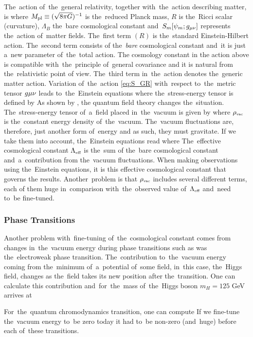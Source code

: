 The~action of~the~general relativity, together with~the~action describing matter, is
where $M_{\text{\scriptsize pl}}\equiv(\sqrt{8\pi G})^{-1}$ is the~reduced Planck mass, $R$ is the~Ricci scalar (curvature), $\Lambda_B$ the~bare cosmological constant and~$S_m[\psi_m;g_{\mu\nu}]$ represents the~action of~matter fields. The~first term $(R)$ is the~standard Einstein-Hilbert action. The~second term consists of the~\textit{bare} cosmological constant and~it is just a~new parameter of~the~total action. The cosmology constant in the action above is compatible with~the~principle of~general covariance and it is natural from the~relativistic point of view. The~third term in~the~action denotes the~generic matter action. Variation of~the~action \eqref{eq:S_GR} with~respect to~the~metric tensor $g{\mu\nu}$ leads to~the~Einstein equations
where the~stress-energy tensor is defined by
As shown by \textcite{1968SPhD...12.1040S}, the quantum field theory changes the~situation. The~stress-energy tensor of~a~field placed in~the~vacuum is given by
where $\rho_\text{\tiny vac}$ is the~constant energy density of~the~vacuum. The~vacuum fluctuations are, therefore, just another form of~energy and as such, they must gravitate. If we take them into account,  the~Einstein equations read
where
The~effective cosmological constant $\Lambda_\text{\tiny eff}$ is the~sum of the~bare cosmological constant and~a~contribution from the~vacuum fluctuations. When making observations using the~Einstein equations, it is this effective cosmological constant that governs the results. Another~problem is that $\rho_\text{\tiny vac}$ includes several different terms, each of them huge in~comparison with~the~observed value of~$\Lambda_\text{\tiny eff}$ and~need to~be fine-tuned.
\subsubsection{Phase Transitions}
\begin{sloppypar}
Another problem with~fine-tuning of~the~cosmological constant comes from changes in~the~vacuum energy during phase transitions such as was the~electroweak phase transition. The~contribution to~the~vacuum energy coming from the~minimum of~a~potential of~some field, in~this case, the~Higgs field, changes as the~field takes its new position after the~transition. One can calculate this contribution \parencite{2012CRPhy..13..566M} and~for~the~mass of~the~Higgs boson $m_H=125$ GeV arrives at
\end{sloppypar}
For~the~quantum chromodynamics transition, one can compute
If we fine-tune the~vacuum energy to~be zero today it had to~be non-zero (and~huge) before each of~these transitions.
